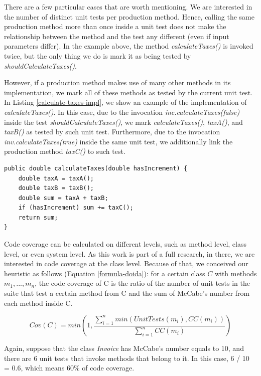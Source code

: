 \documentclass{sig-alternate}
\begin{document}
There are a few particular cases that are worth mentioning. We are interested in the number 
of distinct unit tests per production method. Hence, calling the same production method
more than once inside a unit test does not make the relationship between the method 
and the test any different (even if input parameters differ). In the example above, the 
method \textit{calculateTaxes()} is invoked twice, but the only thing we do is mark it 
as being tested by \textit{shouldCalculateTaxes()}.

However, if a production method makes use of many other methods in its implementation,
we mark all of these methods as tested by the current unit test. In Listing \ref{calculate-taxes-impl},
we show an example of the implementation of \textit{calculateTaxes()}. In this case, due to the 
invocation \textit{inc.calculateTaxes(false)} inside the test \textit{shouldCalculateTaxes()}, 
we mark \textit{calculateTaxes()}, \textit{taxA()}, and \textit{taxB()} as tested 
by such unit test. Furthermore, due to the invocation \textit{inv.calculateTaxes(true)} inside
the same unit test, we additionally link the production method \textit{taxC()} to such test.

\begin{lstlisting}
public double calculateTaxes(double hasIncrement) {
	double taxA = taxA();
	double taxB = taxB();
	double sum = taxA + taxB;
	if (hasIncrement) sum += taxC();
	return sum;
}
\end{lstlisting}

Code coverage can be calculated on different levels, such as method level, class level, or even
system level. As this work is part of a full research, in there, we are interested in code coverage at the class level.
Because of that, we conceived our heuristic as follows (Equation \ref{formula-doida}): 
for a certain class $C$ with methods $m_1, ..., m_n$, 
the code coverage of C is the ratio of the number of unit tests in the suite that test a certain method from C and 
the sum of McCabe's number from each method inside C.

\begin{equation}
\label{formula-doida}
Cov(C) = min(1,\frac{\sum_{i=1}^{n}min(UnitTests(m_i), CC(m_i))}{\sum_{i=1}^{n}{CC(m_i)}})
\end{equation}

Again, suppose that the class \textit{Invoice} has McCabe's number equals to 10, 
and there are 6 unit tests that invoke methods that belong to it. 
In this case, 6 / 10 = 0.6, which means 60\% of code coverage.
\end{document}
